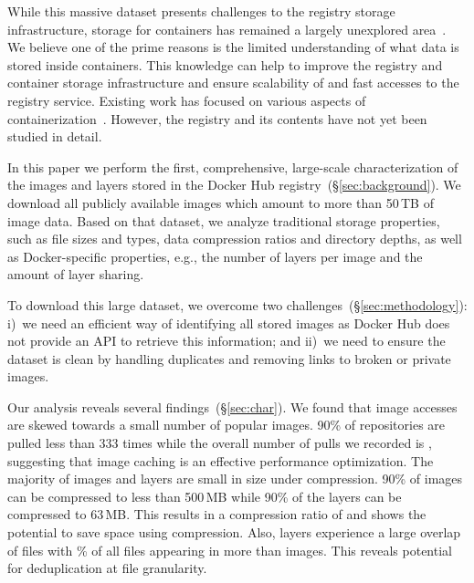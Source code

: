 While this massive dataset presents challenges to the registry storage
infrastructure, storage for containers has remained a largely unexplored
area~\cite{login-container-storage-options}.
%
We believe one of the prime reasons is the limited understanding of what data
is stored inside containers.
%
This knowledge can help to improve the registry and container
storage infrastructure and ensure scalability of and fast accesses to the
registry service.
%
Existing work has focused on various aspects of
containerization~\cite{slacker, dockervulnerabile, dockerfinder,
analysisdockergithub, dockerssd}. However, the registry and its
contents have not yet been studied in detail.

In this paper we perform the first, comprehensive, large-scale characterization
of the images and layers stored in the Docker Hub
registry~(\S\ref{sec:background}).
%
We download all publicly available images which amount to more than 50\,TB of
image data. Based on that dataset, we analyze traditional storage properties, such
as file sizes and types, data compression ratios and directory depths, as well as
Docker-specific properties, e.g., the number of layers per image and the amount of
layer sharing.

To download this large dataset, we overcome two
challenges~(\S\ref{sec:methodology}): i)~we need an efficient way of identifying
all stored images as Docker Hub does not provide an API to retrieve this
information; and ii)~we need to ensure the dataset is clean by handling
duplicates and removing links to broken or private images.

Our analysis reveals several findings~(\S\ref{sec:char}). We found that image
accesses are skewed towards a small number of popular images. 90\% of repositories
are pulled less than 333 times while the overall number of pulls we recorded is
\gap, suggesting that image caching is an effective performance optimization. The
majority of images and layers are small in size under compression. 90\% of images
can be compressed to less than 500\,MB while 90\% of the layers can be compressed
to 63\,MB. This results in a compression ratio of \gap and shows the potential to
save space using compression.
Also, layers experience a large overlap of files with \gap\% of all files
appearing in more than \gap images. This reveals potential for deduplication at
file granularity.


